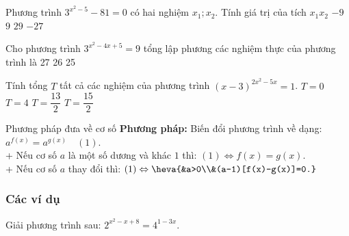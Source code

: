 \begin{ex}%
	Phương trình $3^{x^2-5}-81=0$ có hai nghiệm $x_1;x_2$. Tính giá trị của tích $x_1x_2$ 
	\choice
	{\True $-9$}
	{$9$}
	{$29$}
	{$-27$}
\end{ex}

\begin{ex}%
	Cho phương trình $3^{x^2-4x+5}=9$ tổng lập phương các nghiệm thực của phương trình là 
	\choice
	{}
	{27}
	{26}
	{25}
\end{ex}

\begin{ex}%
	Tính tổng $T$ tất cả các nghiệm của phương trình $(x-3)^{2x^2-5x}=1$. 
	\choice
	{$T=0$}
	{$T=4$}
	{\True $T=\dfrac{13}{2}$}
	{$T=\dfrac{15}{2}$}
\end{ex}

\begin{dang}{Phương pháp đưa về cơ số}
	\textbf{Phương pháp:} Biến đổi phương trình về dạng: $a^{f(x)}=a^{g(x)} \quad (1)$.\\
	+ Nếu cơ số $a$ là một số dương và khác $1$ thì: $(1)\Leftrightarrow f(x)=g(x)$.\\
	+ Nếu cơ số $a$ thay đổi thì: $(1)\Leftrightarrow\heva{&a>0\\&(a-1)[f(x)-g(x)]=0.}$
\end{dang}

\subsubsection{Các ví dụ}
\begin{vd}%
	Giải phương trình sau: $2^{x^2-x+8}=4^{1-3x}$.
\end{vd}

